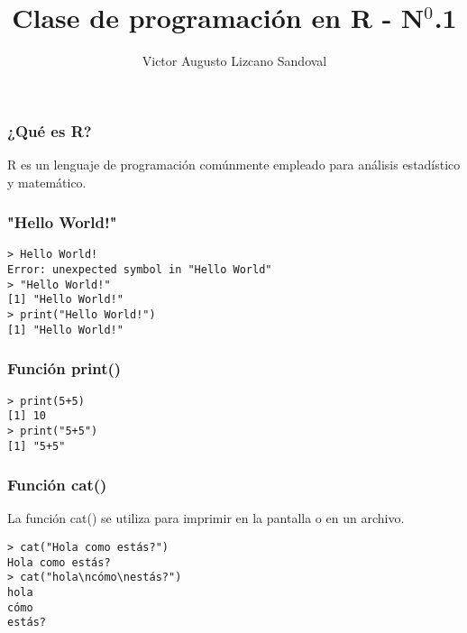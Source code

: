 \documentclass[12pt]{beamer}
\begin{document}
	\author{Victor Augusto Lizcano Sandoval}
	\title{Clase de programación en R - N$^{0}$.1}
	\begin{frame}[plain]
		\maketitle
	\end{frame}
	
	\begin{frame}
		\frametitle{¿Qué es R?}
		R es un lenguaje de programación comúnmente empleado para análisis estadístico y matemático. 
	\end{frame}

	\begin{frame}
		\frametitle{"Hello World!"}

		\texttt{> Hello World!}\\
		\texttt{Error: unexpected symbol in "Hello World"}\\
		\texttt{> "Hello World!"}\\
		\texttt{[1] "Hello World!"}\\
		\texttt{> print("Hello World!")}\\
		\texttt{[1] "Hello World!"}	\\					
	\end{frame}

	\begin{frame}
		\frametitle{Función print()}
		\texttt{> print(5+5)}\\
		\texttt{[1] 10}\\
		\texttt{> print("5+5")}\\
		\texttt{[1] "5+5"}		
		
	\end{frame}

	\begin{frame}
	\frametitle{Función cat()}
	
	La función cat() se utiliza para imprimir en la pantalla o en un archivo.
	
	\texttt{> cat("Hola como estás?")}\\
	\texttt{Hola como estás?}\\
	\texttt{> cat("hola\textbackslash ncómo\textbackslash nestás?")}\\
	\texttt{hola}\\
	\texttt{cómo}\\
	\texttt{estás?}		
\end{frame}
\end{document}
